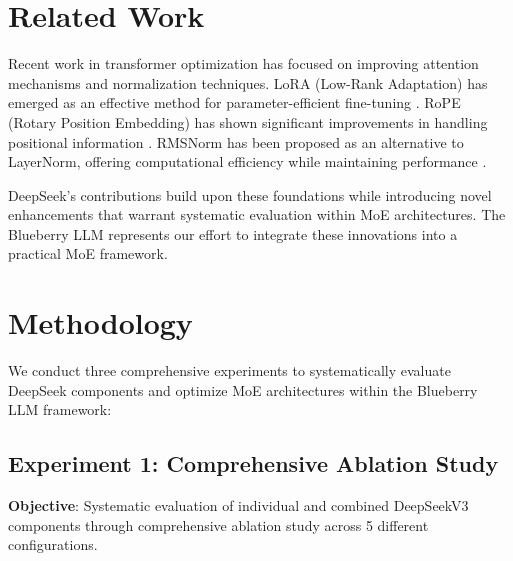 \documentclass[11pt,a4paper]{article}
\begin{document}
\section{Related Work}

Recent work in transformer optimization has focused on improving attention mechanisms and normalization techniques. LoRA (Low-Rank Adaptation) has emerged as an effective method for parameter-efficient fine-tuning \cite{hu2021lora}. RoPE (Rotary Position Embedding) has shown significant improvements in handling positional information \cite{su2021roformer}. RMSNorm has been proposed as an alternative to LayerNorm, offering computational efficiency while maintaining performance \cite{zhang2019root}.

DeepSeek's contributions build upon these foundations while introducing novel enhancements that warrant systematic evaluation within MoE architectures. The Blueberry LLM represents our effort to integrate these innovations into a practical MoE framework.

\section{Methodology}

We conduct three comprehensive experiments to systematically evaluate DeepSeek components and optimize MoE architectures within the Blueberry LLM framework:

\subsection{Experiment 1: Comprehensive Ablation Study}

\textbf{Objective}: Systematic evaluation of individual and combined DeepSeekV3 components through comprehensive ablation study across 5 different configurations.
\end{document}
